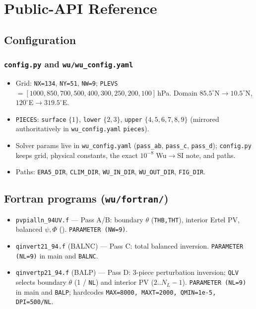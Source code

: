 \chapter{Public-API Reference}
\label{app:api}

\section{Configuration}

\subsection{\texttt{config.py} and \texttt{wu/wu\_config.yaml}}
\begin{itemize}\setlength\itemsep{0pt}
\item Grid: \texttt{NX=134}, \texttt{NY=51}, \texttt{NW=9};
      \texttt{PLEVS} $=[1000,850,700,500,400,300,250,200,100]$\,hPa.
      Domain $85.5^\circ$N$\to$$10.5^\circ$N, $120^\circ$E$\to$$319.5^\circ$E.
\item \texttt{PIECES}: \texttt{surface} $\{1\}$, \texttt{lower} $\{2,3\}$,
      \texttt{upper} $\{4,5,6,7,8,9\}$ (mirrored authoritatively in
      \texttt{wu\_config.yaml} \texttt{pieces}).
\item Solver params live in \texttt{wu\_config.yaml} (\texttt{pass\_ab},
      \texttt{pass\_c}, \texttt{pass\_d}); \texttt{config.py} keeps grid,
      physical constants, the exact $10^{-8}$ Wu$\to$SI note, and paths.
\item Paths: \texttt{ERA5\_DIR}, \texttt{CLIM\_DIR}, \texttt{WU\_IN\_DIR},
      \texttt{WU\_OUT\_DIR}, \texttt{FIG\_DIR}.
\end{itemize}

\section{Fortran programs (\texttt{wu/fortran/})}
\begin{itemize}\setlength\itemsep{0pt}
\item \texttt{pvpialln\_94UV.f} --- Pass A/B: boundary $\theta$
      (\texttt{THB,THT}), interior Ertel PV, balanced $\psi,\Phi$
      ().  \texttt{PARAMETER (NW=9)}.
\item \texttt{qinvert21\_94.f} (BALNC) --- Pass C: total balanced
      inversion.  \texttt{PARAMETER (NL=9)} in main and \texttt{BALNC}.
\item \texttt{qinvertp21\_94.f} (BALP) --- Pass D: 3-piece perturbation
      inversion; \texttt{QLV} selects boundary $\theta$ (1 / \texttt{NL})
      and interior PV ($2..N_L{-}1$).  \texttt{PARAMETER (NL=9)} in main
      and \texttt{BALP}; hardcodes \texttt{MAX=8000, MAXT=2000,
      QMIN=1e-5, DPI=500/NL}.
\end{itemize}

